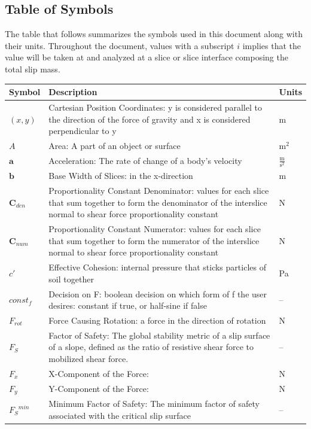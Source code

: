 \documentclass[12pt]{article}
\begin{document}
\subsection{Table of Symbols}
\label{Sec:ToS}
The table that follows summarizes the symbols used in this document along with their units. Throughout the document, values with a subscript $i$ implies that the value will be taken at and analyzed at a slice or slice interface composing the total slip mass.
\begin{longtabu}{l X[l] l}
\toprule
Symbol & Description & Units
\\
\midrule
\endhead
$(x,y)$ & Cartesian Position Coordinates: y is considered parallel to the direction of the force of gravity and x is considered perpendicular to y & m
\\
$A$ & Area: A part of an object or surface & $\text{m}^{2}$
\\
$\mathbf{a}$ & Acceleration: The rate of change of a body's velocity & $\frac{\text{m}}{\text{s}^{2}}$
\\
$\mathbf{b}$ & Base Width of Slices: in the x-direction & m
\\
${\mathbf{C}_{den}}$ & Proportionality Constant Denominator: values for each slice that sum together to form the denominator of the interslice normal to shear force proportionality constant & N
\\
${\mathbf{C}_{num}}$ & Proportionality Constant Numerator: values for each slice that sum together to form the numerator of the interslice normal to shear force proportionality constant & N
\\
$c'$ & Effective Cohesion: internal pressure that sticks particles of soil together & Pa
\\
$const_f$ & Decision on F: boolean decision on which form of f the user desires: constant if true, or half-sine if false & --
\\
${F_{rot}}$ & Force Causing Rotation: a force in the direction of rotation & N
\\
${F_{S}}$ & Factor of Safety: The global stability metric of a slip surface of a slope, defined as the ratio of resistive shear force to mobilized shear force. & --
\\
${F_{x}}$ & X-Component of the Force:  & N
\\
${F_{y}}$ & Y-Component of the Force:  & N
\\
${{F_{S}}^{min}}$ & Minimum Factor of Safety: The minimum factor of safety associated with the critical slip surface & --
\\

\end{longtabu}
\end{document}
